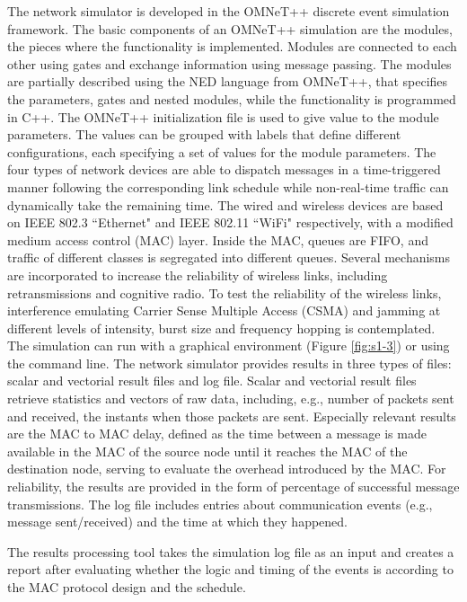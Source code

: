 \documentclass[conference]{IEEEtran}
\begin{document}
The network simulator is developed in the OMNeT++ discrete event simulation framework. The basic components of an OMNeT++ simulation are the modules, the pieces where the functionality is implemented. Modules are connected to each other using gates and exchange information using message passing. The modules are partially described using the NED language from OMNeT++, that specifies the parameters, gates and nested modules, while the functionality is programmed in C++. The OMNeT++ initialization file is used to give value to the module parameters. The values can be grouped with labels that define different configurations, each specifying a set of values for the module parameters. The four types of network devices are able to dispatch messages in a time-triggered manner following the corresponding link schedule while non-real-time traffic can dynamically take the remaining time. The wired and wireless devices are based on IEEE 802.3 ``Ethernet" and IEEE 802.11 ``WiFi" respectively, with a modified medium access control (MAC) layer. Inside the MAC, queues are FIFO, and traffic of different classes is segregated into different queues. Several mechanisms are incorporated to increase the reliability of wireless links, including retransmissions and cognitive radio. To test the reliability of the wireless links, interference emulating Carrier Sense Multiple Access (CSMA) and jamming at different levels of intensity, burst size and frequency hopping is contemplated. The simulation can run with a graphical environment (Figure \ref{fig:s1-3}) or using the command line. The network simulator provides results in three types of files: scalar and vectorial result files and log file. Scalar and vectorial result files retrieve statistics and vectors of raw data, including, e.g., number of packets sent and received, the instants when those packets are sent. Especially relevant results are the MAC to MAC delay, defined as the time between a message is made available in the MAC of the source node until it reaches the MAC of the destination node, serving to evaluate the overhead introduced by the MAC. For reliability, the results are provided in the form of percentage of successful message transmissions. The log file includes entries about communication events (e.g., message sent/received) and the time at which they happened.

The results processing tool takes the simulation log file as an input and creates a report after evaluating whether the logic and timing of the events is according to the MAC protocol design and the schedule.
\end{document}
